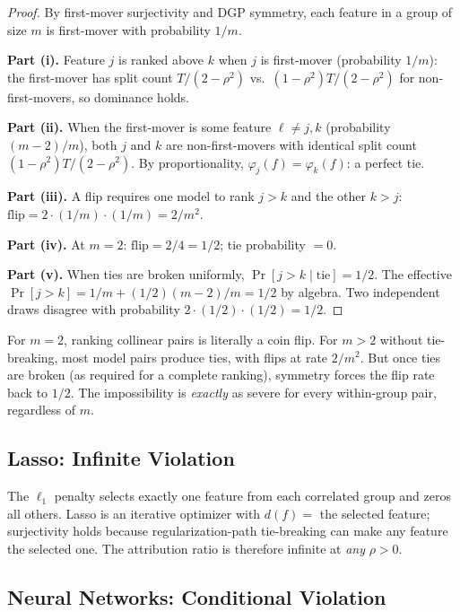 \documentclass{article}
\begin{document}
\begin{proof}
By first-mover surjectivity and DGP symmetry, each feature in a group of size $m$ is first-mover with probability $1/m$.

\textbf{Part (i).} Feature $j$ is ranked above $k$ when $j$ is first-mover (probability $1/m$): the first-mover has split count $T/(2-\rho^2)$ vs.\ $(1-\rho^2)T/(2-\rho^2)$ for non-first-movers, so dominance holds.

\textbf{Part (ii).} When the first-mover is some feature $\ell \neq j, k$ (probability $(m-2)/m$), both $j$ and $k$ are non-first-movers with identical split count $(1-\rho^2)T/(2-\rho^2)$. By proportionality, $\varphi_j(f) = \varphi_k(f)$: a perfect tie.

\textbf{Part (iii).} A flip requires one model to rank $j > k$ and the other $k > j$: $\text{flip} = 2 \cdot (1/m) \cdot (1/m) = 2/m^2$.

\textbf{Part (iv).} At $m=2$: $\text{flip} = 2/4 = 1/2$; tie probability $= 0$.

\textbf{Part (v).} When ties are broken uniformly, $\Pr[j > k \mid \text{tie}] = 1/2$. The effective $\Pr[j > k] = 1/m + (1/2)(m-2)/m = 1/2$ by algebra. Two independent draws disagree with probability $2 \cdot (1/2) \cdot (1/2) = 1/2$.
\end{proof}

For $m = 2$, ranking collinear pairs is literally a coin flip. For $m > 2$ without tie-breaking, most model pairs produce ties, with flips at rate $2/m^2$. But once ties are broken (as required for a complete ranking), symmetry forces the flip rate back to $1/2$. The impossibility is \emph{exactly} as severe for every within-group pair, regardless of $m$.

\subsection{Lasso: Infinite Violation}
\label{sec:lasso}

The $\ell_1$ penalty selects exactly one feature from each correlated group and zeros all others. Lasso is an iterative optimizer with $d(f) =$ the selected feature; surjectivity holds because regularization-path tie-breaking can make any feature the selected one. The attribution ratio is therefore infinite at \emph{any} $\rho > 0$.

\subsection{Neural Networks: Conditional Violation}
\label{sec:nn}
\end{document}
